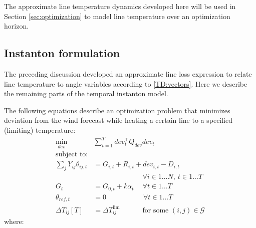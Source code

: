 \documentclass[conference]{IEEEtran}
\begin{document}
The approximate line temperature dynamics developed here will be used
in Section \ref{sec:optimization} to model line temperature over an
optimization horizon.

\subsection{Instanton formulation}\label{sec:instanton-formulation}

The preceding discussion developed an approximate line loss expression
to relate line temperature to angle variables according to
\eqref{TD:vectors}. Here we describe the remaining parts of the
temporal instanton model.

The following equations describe an optimization problem that
minimizes deviation from the wind forecast while heating a certain
line to a specified (limiting) temperature:
\begin{subequations}\label{I:all}
\begin{align}
\label{I:obj}\underset{dev}{\min} \quad & \sum_{t=1}^{T} dev_t^\top Q_{dev} dev_t \\
\nonumber \text{subject to:} & \\
\label{I:flow} \sum_j Y_{ij} \theta_{ij,t} & = G_{i,t} + R_{i,t} +
dev_{i,t} - D_{i,t} \\[-8pt]
\nonumber &\qquad\qquad\qquad\quad \forall i \in 1... N,~t\in 1... T \\%
\label{I:conv} G_t &= G_{0,t} + k\alpha_t \quad\: \forall t\in 1\ldots T \\
\label{I:slack} \theta_{ref,t} & = 0 \qquad\qquad\quad\; \forall t\in 1\ldots T \\
\label{I:lim} \Delta T_{ij}[T] &= \Delta T_{ij}^\text{lim}\qquad\quad\: \text{for some }(i,j)\in \mathcal{G}
\end{align}
\end{subequations}
where:
\end{document}
